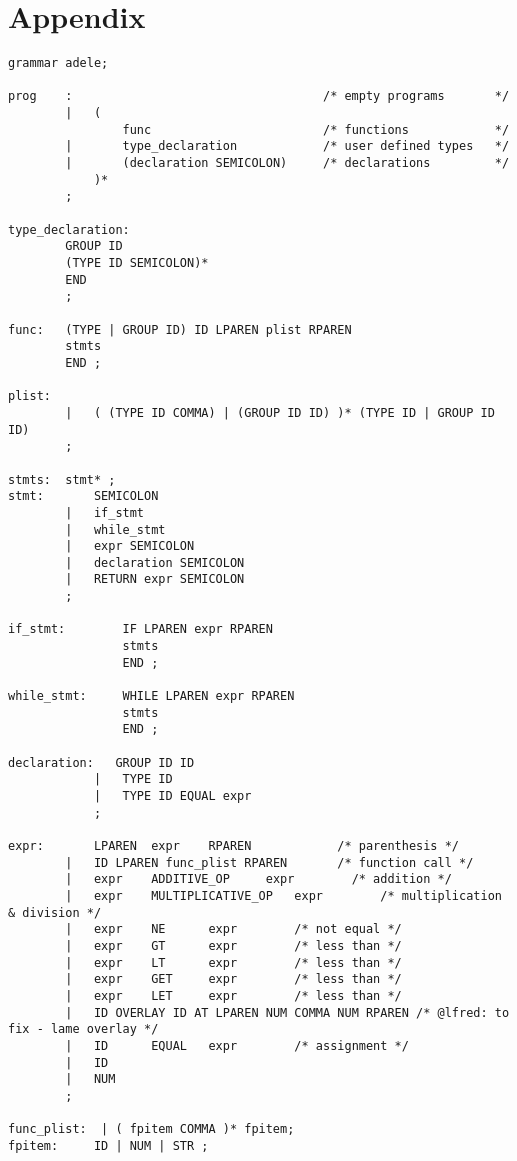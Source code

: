 \documentclass[11pt,letterpaper]{article}
\begin{document}
\section{Appendix}
\begin{lstlisting}[tabsize=4]
grammar adele;

prog    :                                   /* empty programs       */ 
        |   ( 
                func                        /* functions            */
        |       type_declaration            /* user defined types   */
        |       (declaration SEMICOLON)     /* declarations         */
            )*              
        ;
        
type_declaration:
        GROUP ID 
        (TYPE ID SEMICOLON)* 
        END
        ;

func:   (TYPE | GROUP ID) ID LPAREN plist RPAREN 
        stmts
        END ;

plist:  
        |   ( (TYPE ID COMMA) | (GROUP ID ID) )* (TYPE ID | GROUP ID ID) 
        ;

stmts:  stmt* ;
stmt:       SEMICOLON       
        |   if_stmt       
        |   while_stmt      
        |   expr SEMICOLON  
        |   declaration SEMICOLON
        |   RETURN expr SEMICOLON
        ;

if_stmt:        IF LPAREN expr RPAREN 
                stmts 
                END ;

while_stmt:     WHILE LPAREN expr RPAREN 
                stmts 
                END ;

declaration:   GROUP ID ID
            |   TYPE ID 
            |   TYPE ID EQUAL expr
            ;

expr:       LPAREN  expr    RPAREN            /* parenthesis */
        |   ID LPAREN func_plist RPAREN       /* function call */
        |   expr    ADDITIVE_OP     expr        /* addition */
        |   expr    MULTIPLICATIVE_OP   expr        /* multiplication & division */
        |   expr    NE      expr        /* not equal */
        |   expr    GT      expr        /* less than */
        |   expr    LT      expr        /* less than */
        |   expr    GET     expr        /* less than */
        |   expr    LET     expr        /* less than */
        |   ID OVERLAY ID AT LPAREN NUM COMMA NUM RPAREN /* @lfred: to fix - lame overlay */
        |   ID      EQUAL   expr        /* assignment */
        |   ID  
        |   NUM
        ; 

func_plist:  | ( fpitem COMMA )* fpitem;
fpitem:     ID | NUM | STR ;


\end{lstlisting}
\end{document}
